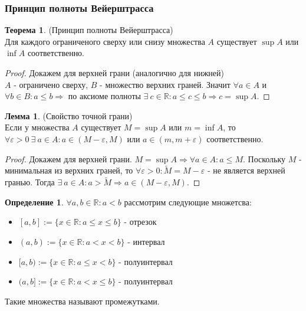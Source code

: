 \documentclass[a4paper, 12pt]{article}
\newcommand{\R}{\mathbb{R}}
\renewcommand{\epsilon}{\varepsilon}
\theoremstyle{definition}
\newtheorem*{definition}{Определение}
\newtheorem*{theorem}{Теорема}
\newtheorem*{lemma}{Лемма}
\begin{document}
        \subsubsection{Принцип полноты Вейерштрасса}
        \begin{theorem} (Принцип полноты Вейерштрасса) \\
            Для каждого ограниченого сверху или снизу множества $A$ существует $\sup A$ или $\inf A$ соответственно.
        \end{theorem}
        \begin{proof}
            Докажем для верхней грани (аналогично для нижней)\\
            $A$ - ограничено сверху, $B$ - множество верхних граней. Значит $\forall a\in A$ и \\$\forall b\in B: a\leq b \Rightarrow$ по аксиоме полноты $\exists\ c\in \R: a\leq c\leq b \Rightarrow c=\sup A$.
        \end{proof}
        \begin{lemma} (Свойство точной грани)\\
            Если у множества $A$ существует $M=\sup{A}$ или $m=\inf{A}$, то $\forall \epsilon>0\ \exists\ a\in A: a\in (M-\epsilon,M)$ или $a\in (m,m+\epsilon)$ соответственно.
        \end{lemma}
        \begin{proof}
            Докажем для верхней грани. $M=\sup{A}\Rightarrow \forall a\in A: a\leq M$. Поскольку $M$ - минимальная из верхних граней, то $\forall \epsilon>0: \widetilde{M}=M-\epsilon$ - не является верхней гранью. Тогда $\exists\ a\in A: a>\widetilde{M} \Rightarrow a\in (M-\epsilon,M)$.
        \end{proof} 
        \begin{definition}
            $\forall a,b\in \R: a<b$ рассмотрим следующие множетсва:
            \begin{itemize}
                \item $[a,b] := \{x\in \R: a\leq x\leq b\}$ - отрезок
                \item $(a,b) := \{x\in \R: a<x<b\}$ - интервал
                \item $[a,b) := \{x\in \R: a\leq x<b\}$ - полуинтервал
                \item $(a,b] := \{x\in \R: a<x\leq b\}$ - полуинтервал
            \end{itemize}
            Такие множества называют промежутками.
        \end{definition} 
\end{document}
